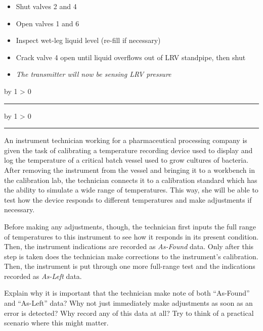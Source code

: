 \documentclass[12pt,a4paper]{article}
\def\oppgave{
            \advance\questnum by 1
            \ifnum \questnum > 0
                 \hrule
                 \vskip 3pt
                 \leftline{Oppgave \the\questnum}
                 \vskip 3pt \fi}
\def\notes{
           \advance\explnum by 1
           \ifnum \explnum > 0
                \hrule
                \vskip 3pt
                \leftline{Notes \the\explnum}
                \vskip 3pt \fi}
\begin{document}
\begin{itemize}
\item{} Shut valves 2 and 4
\item{} Open valves 1 and 6
\item{} Inspect wet-leg liquid level (re-fill if necessary)
\item{} Crack valve 4 open until liquid overflows out of LRV standpipe, then shut
\item{} {\it The transmitter will now be sensing LRV pressure}
\end{itemize}

\vskip 10pt \filbreak 





\notes{} 




\vfil \eject 



\oppgave{} 

An instrument technician working for a pharmaceutical processing company is given the task of calibrating a temperature recording device used to display and log the temperature of a critical batch vessel used to grow cultures of bacteria.  After removing the instrument from the vessel and bringing it to a workbench in the calibration lab, the technician connects it to a calibration standard which has the ability to simulate a wide range of temperatures.  This way, she will be able to test how the device responds to different temperatures and make adjustments if necessary.

Before making any adjustments, though, the technician first inputs the full range of temperatures to this instrument to see how it responds in its present condition.  Then, the instrument indications are recorded as {\it As-Found} data.  Only after this step is taken does the technician make corrections to the instrument's calibration.  Then, the instrument is put through one more full-range test and the indications recorded as {\it As-Left} data.

Explain why it is important that the technician make note of both ``As-Found'' and ``As-Left'' data?  Why not just immediately make adjustments as soon as an error is detected?  Why record any of this data at all?  Try to think of a practical scenario where this might matter.
\end{document}
